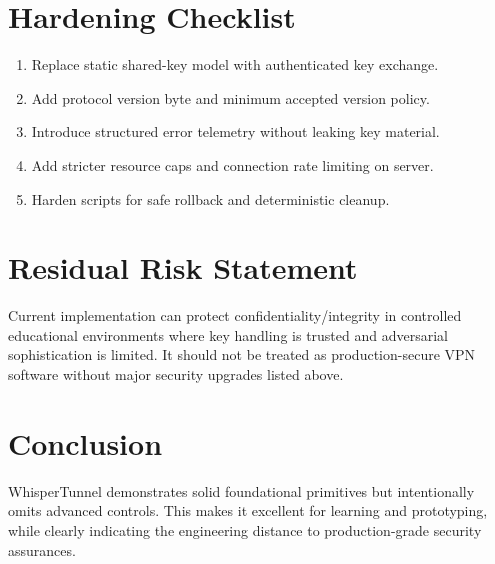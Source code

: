 \section{Hardening Checklist}
\begin{enumerate}[leftmargin=2em]
\item Replace static shared-key model with authenticated key exchange.
\item Add protocol version byte and minimum accepted version policy.
\item Introduce structured error telemetry without leaking key material.
\item Add stricter resource caps and connection rate limiting on server.
\item Harden scripts for safe rollback and deterministic cleanup.
\end{enumerate}

\section{Residual Risk Statement}
Current implementation can protect confidentiality/integrity in controlled educational environments where key handling is trusted and adversarial sophistication is limited. It should not be treated as production-secure VPN software without major security upgrades listed above.

\section{Conclusion}
WhisperTunnel demonstrates solid foundational primitives but intentionally omits advanced controls. This makes it excellent for learning and prototyping, while clearly indicating the engineering distance to production-grade security assurances.
